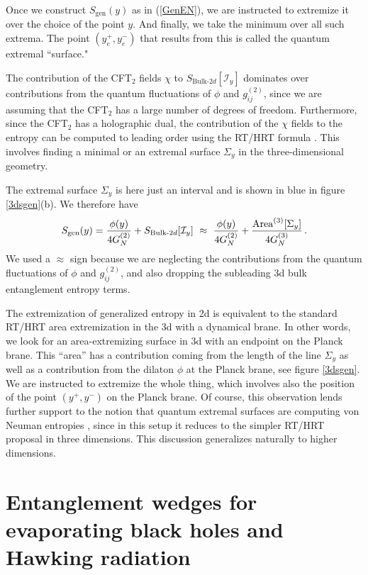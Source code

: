 \documentclass[11pt]{article}
\def\nref#1{(\ref{#1})}
\begin{document}
Once we construct $S_\text{gen}(y)$ as in \nref{GenEN}, we are instructed to extremize it over the choice of the point $y$. 
And finally, we take the minimum over all such extrema. 
The point $(y_e^+,y_e^-)$ that results from this is called the quantum extremal ``surface."

The contribution of the CFT$_2$ fields $\chi$ to $S_{\mathrm{Bulk}\text{-}2d}[\mathcal{I}_y]$ dominates over contributions from the quantum fluctuations of $\phi$ and $g_{ij}^{(2)}$, since we are assuming that the CFT$_2$ has a large number of degrees of freedom.
Furthermore, since the CFT$_2$  has a holographic dual, the contribution of the $\chi$ fields to the entropy can be computed to leading order using the RT/HRT formula \cite{Ryu:2006bv,Hubeny:2007xt}. 
This involves  finding a minimal or an extremal surface $\Sigma_y$ in the three-dimensional geometry.

The extremal surface $\Sigma_y $ is here just an interval and is shown in blue in  figure \ref{3dsgen}(b).
We therefore have
\begin{align}
    S_\mathrm{gen}(y)  =  {\phi(y)  \over 4 G_N^{(2)} } + 
    S_{\mathrm{Bulk}\text{-}2d}[\mathcal{I}_y]
    ~ \approx ~    
    {\phi(y)  \over 4 G_N^{(2)} }  + 
    {\mathrm{Area}^{(3)}[ \Sigma_y ] \over 4 G_N^{(3)}} \, .
\end{align} 
We used a $\approx$ sign because we are neglecting the contributions from the quantum fluctuations of $\phi$ and $g_{ij}^{(2)}$, and also dropping the subleading 3d bulk entanglement entropy terms.

The extremization of generalized entropy in 2d is equivalent to the standard RT/HRT area extremization in the 3d with a dynamical brane.  
In other words, we look for an area-extremizing surface in 3d with an endpoint on the Planck brane. 
This ``area'' has a contribution coming from the length of the line $\Sigma_y$ as well as a contribution from the dilaton $\phi$ at the Planck brane, see figure \ref{3dsgen}.
We are instructed to extremize the whole thing, which involves also the position of the point $(y^+, y^-)$ on the Planck brane. 
Of course, this observation lends further support to the notion that quantum extremal surfaces are computing von Neuman entropies \cite{Engelhardt:2014gca}, since in this setup it reduces to the simpler RT/HRT proposal in three  dimensions.  This discussion generalizes naturally to higher dimensions.


\section{Entanglement wedges for evaporating black holes and Hawking radiation}   
\label{section:QES}
  
\end{document}
